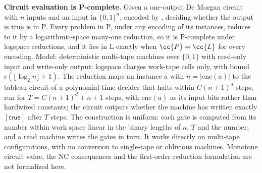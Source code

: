 \textbf{Circuit evaluation is P-complete.}
Given a one-output De Morgan circuit with $n$ inputs and an input in
$\{0,1\}^n$, encoded by , deciding whether the output is
true is in P. Every problem in P, under any encoding of its instances, reduces to
it by a logarithmic-space many-one reduction, so it is P-complete under logspace
reductions, and it lies in L exactly when $\cc{P}=\cc{L}$ for every encoding.
Model: deterministic multi-tape machines over $\{0,1\}$ with read-only input and
write-only output; logspace charges work-tape cells only, with bound
$c(\lfloor\log_2 n\rfloor+1)$. The reduction maps an instance $a$ with
$n=|\mathrm{enc}(a)|$ to the tableau circuit of a polynomial-time decider that halts
within $C(n+1)^d$ steps, run for $T=C(n+1)^d+n+1$ steps, with $\mathrm{enc}(a)$ as its
input bits rather than hardwired constants; the circuit outputs whether the machine
has written exactly $[\mathsf{true}]$ after $T$ steps. The construction is uniform:
each gate is computed from its number within work space linear in the binary
lengths of $n$, $T$ and the number, and a read machine writes the gates in turn. It
works directly on multi-tape configurations, with no conversion to single-tape or
oblivious machines. Monotone circuit value, the NC consequences and the
first-order-reduction formulation are not formalized here.
\citep{Ladner1975,AroraBarak09,Papadimitriou94}
